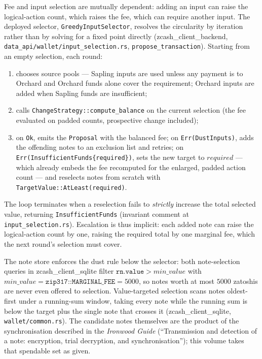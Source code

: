\documentclass[11pt,a4paper]{article}
\theoremstyle{definition}
\begin{document}
Fee and input selection are mutually dependent: adding an input can raise
the logical-action count, which raises the fee, which can require another
input. The deployed selector, \texttt{GreedyInputSelector}, resolves the
circularity by iteration rather than by solving for a fixed point directly
(\textsf{zcash\_client\_backend},
\texttt{data\_api/wallet/input\_selection.rs},
\texttt{propose\_transaction}). Starting from an empty selection, each
round:
\begin{enumerate}[leftmargin=*]
\item chooses source pools --- Sapling inputs are used unless any payment
is to Orchard and Orchard funds alone cover the requirement; Orchard
inputs are added when Sapling funds are insufficient;
\item calls \texttt{ChangeStrategy::compute\_balance} on the current
selection (the fee evaluated on padded counts, prospective change
included);
\item on \texttt{Ok}, emits the \texttt{Proposal} with the balanced fee; on
\texttt{Err(DustInputs)}, adds the offending notes to an exclusion list and
retries; on \texttt{Err(InsufficientFunds\{required\})}, sets the new
target to $\mathit{required}$ --- which already embeds the fee recomputed
for the enlarged, padded action count --- and reselects notes from scratch
with \texttt{TargetValue::AtLeast(required)}.
\end{enumerate}
The loop terminates when a reselection fails to \emph{strictly} increase
the total selected value, returning \texttt{InsufficientFunds} (invariant
comment at \texttt{input\_selection.rs}). Escalation is thus implicit: each
added note can raise the logical-action count by one, raising the required
total by one marginal fee, which the next round's selection must cover.

The note store enforces the dust rule below the selector:
both note-selection queries in \textsf{zcash\_client\_sqlite} filter
$\texttt{rn.value} > \mathit{min\_value}$ with
$\mathit{min\_value} = \texttt{zip317::MARGINAL\_FEE} = 5000$, so notes
worth at most $5000$ zatoshis are never even offered to selection.
Value-targeted selection scans notes oldest-first under a running-sum
window, taking every note while the running sum is below the target plus
the single note that crosses it (\textsf{zcash\_client\_sqlite},
\texttt{wallet/common.rs}). The candidate notes themselves are the product
of the synchronisation described in the \emph{Ironwood Guide}
(``Transmission and detection of a note: encryption, trial decryption, and
synchronisation''); this volume takes that spendable set as given.
\end{document}
